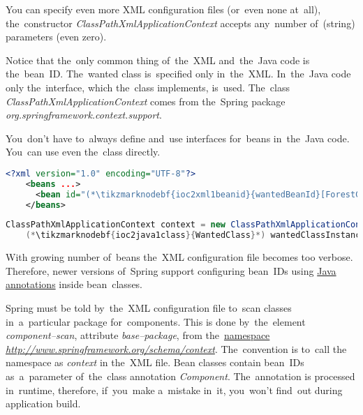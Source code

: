 \noindent You can specify even more XML configuration files (or~even none at~all), the~constructor \textit{ClassPathXmlApplicationContext} accepts any~number of~(string) parameters (even zero).

Notice that the~only common thing of~the~XML and~the~Java code is the~bean~ID. The~wanted class is~specified only in~the~XML. In~the~Java code only the~interface, which the~class implements, is~used. The~class \textit{ClassPathXmlApplicationContext} comes from the~Spring package \textit{org.springframework.context.support}.

\note You~don't have to~always define and~use interfaces for~beans in~the~Java code. You~can use even the~class directly.

\example
\begin{lstlisting}[language=XML, title={Configuration XML}]
    <?xml version="1.0" encoding="UTF-8"?>
    <beans ...>
      <bean id="(*\tikzmarknodebf{ioc2xml1beanid}{wantedBeanId}[ForestGreen]*)" class="package.subfolder.(*\tikzmarknodebf{ioc2xml1class}{WantedClass}[ForestGreen]*)"/>
    </beans>
\end{lstlisting}
\begin{lstlisting}[language=Java, title={Usage}]
    ClassPathXmlApplicationContext context = new ClassPathXmlApplicationContext("configurationFile.xml");
    (*\tikzmarknodebf{ioc2java1class}{WantedClass}*) wantedClassInstance = context.getBean("(*\tikzmarknodebf{ioc2java1beanid}{wantedBeanId}[ForestGreen]*)", (*\tikzmarknodebf{ioc2java1class2}{WantedClass}*).class);
\end{lstlisting}
\newpage

\label{iocannotations}
With growing number of~beans the~XML configuration file becomes too verbose. Therefore, newer versions of~Spring support configuring bean~IDs using \hyperref[javaannotation]{Java annotations} inside bean~classes.

Spring must be told by~the~XML configuration file to~scan classes in~a~particular package for~components. This is done by~the~element \textit{component--scan}, attribute \textit{base--package}, from the~\hyperref[namespaces]{namespace} \textit{\href{http://www.springframework.org/schema/context}{http://www.springframework.org/schema/context}}. The~convention is to~call the namespace as \textit{context} in the~XML file. Bean classes contain bean~IDs as~a~parameter of~the~class annotation \textit{Component}. The~annotation is processed in~runtime, therefore, if~you~make a~mistake in~it, you~won't find~out during application build.


